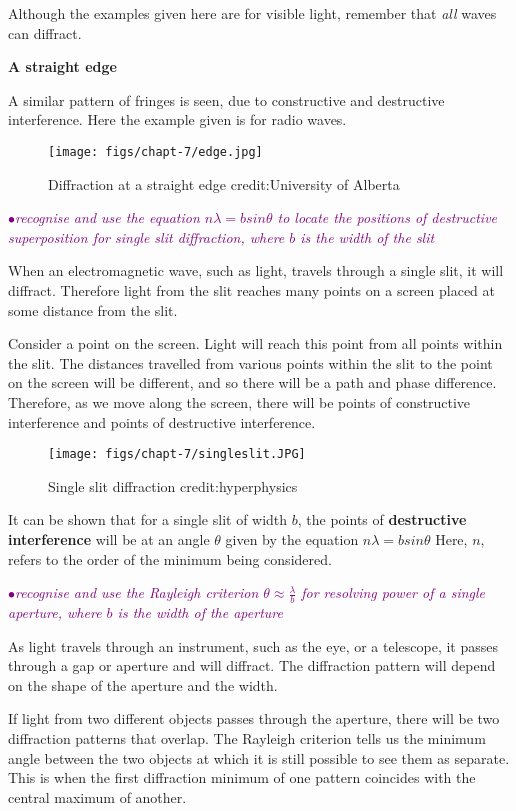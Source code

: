 \documentclass[a4paper,11pt,twoside]{memoir}
\newcounter{spec}[chapter]
\newcommand{\spec}[1]{\Needspace{5\baselineskip}\textcolor{purple}{$\bullet$\hspace{0.5cm}\textit{#1}}}
\begin{document}
Although the examples given here are for visible light, remember that \emph{all} waves can diffract.

\textbf{A straight edge}

A similar pattern of fringes is seen, due to constructive and destructive interference. Here the example given is for radio waves.

\begin{figure}[h!]
\centering
\texttt{[image: figs/chapt-7/edge.jpg]}
\caption{Diffraction at a straight edge {credit:University of Alberta}}
\end{figure}

\spec{recognise and use the equation $n\lambda = b sin\theta$ to locate the positions of destructive superposition for single slit diffraction, where $b$ is the width of the slit}

When an electromagnetic wave, such as light, travels through a single slit, it will diffract. Therefore light from the slit reaches many points on a screen placed at some distance from the slit.

Consider a point on the screen. Light will reach this point from all points within the slit. The distances travelled from various points within the slit to the point on the screen will be different, and so there will be a path and phase difference. Therefore, as we move along the screen, there will be points of constructive interference and points of destructive interference.

\begin{figure}[h!]
\centering
\texttt{[image: figs/chapt-7/singleslit.JPG]}
\caption{Single slit diffraction {credit:hyperphysics}}
\end{figure}

It can be shown that for a single slit of width $b$, the points of \textbf{destructive interference} will be at an angle $\theta$ given by the equation
$n\lambda = b sin\theta$
Here, $n$, refers to the order of the minimum being considered.

\spec{recognise and use the Rayleigh criterion $\theta \approx \frac{\lambda}{b}$ for resolving power of a single aperture, where $b$ is the width of the aperture}

As light travels through an instrument, such as the eye, or a telescope, it passes through a gap or aperture and will diffract. The diffraction pattern will depend on the shape of the aperture and the width.

If light from two different objects passes through the aperture, there will be two diffraction patterns that overlap. The Rayleigh criterion tells us the minimum angle between the two objects at which it is still possible to see them as separate. This is when the first diffraction minimum of one pattern coincides with the central maximum of another.
\end{document}
